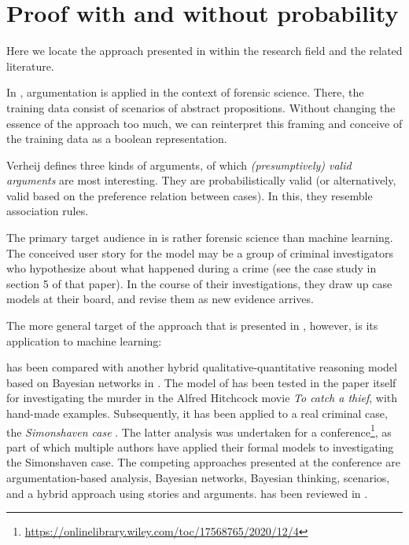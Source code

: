 \section{Proof with and without probability}\label{without}

Here we locate the approach presented in \citet{verheijProofProbabilities2017} within the research field and the related literature.

In \cite{verheijProofProbabilities2017}, argumentation is applied in the context of forensic science. There, the training data consist of scenarios of abstract propositions. Without changing the essence of the approach too much, we can reinterpret this framing and conceive of the training data as a boolean representation.

Verheij defines three kinds of arguments, of which \textit{(presumptively) valid arguments} are most interesting. They are probabilistically valid (or alternatively, valid based on the preference relation between cases). In this, they resemble association rules. 

The primary target audience in \cite{verheijProofProbabilities2017} is rather forensic science than machine learning. The conceived user story for the model may be a group of criminal investigators who hypothesize about what happened during a crime (see the case study in section 5 of that paper). In the course of their investigations, they draw up case models at their board, and revise them as new evidence arrives. 

The more general target of the approach that is presented in \cite{verheijProofProbabilities2017}, however, is its application to machine learning:  \citep[p.~66]{verheijArgumentsGoodArtificial2018}

\cite{verheijProofProbabilities2017} has been compared with another hybrid qualitative-quantitative reasoning model based on Bayesian networks in \citet{vanleeuwenComparisonTwoHybrid2019}. The model of \cite{verheijProofProbabilities2017} has been tested in the paper itself for investigating the murder in the Alfred Hitchcock movie \textit{To catch a thief}, with hand-made examples. Subsequently, it has been applied to a real criminal case, the \textit{Simonshaven case} \cite{verheijAnalyzingSimonshavenCase2020}. The latter analysis was undertaken for a conference\footnote{\url{https://onlinelibrary.wiley.com/toc/17568765/2020/12/4}}, as part of which multiple authors have applied their formal models to investigating the Simonshaven case. The competing approaches presented at the conference are argumentation-based analysis, Bayesian networks, Bayesian thinking, scenarios, and a hybrid approach using stories and arguments. \citet{verheijAnalyzingSimonshavenCase2020} has been reviewed in \cite{zenkerStoriesviaArgumentsScenarios2020}.

